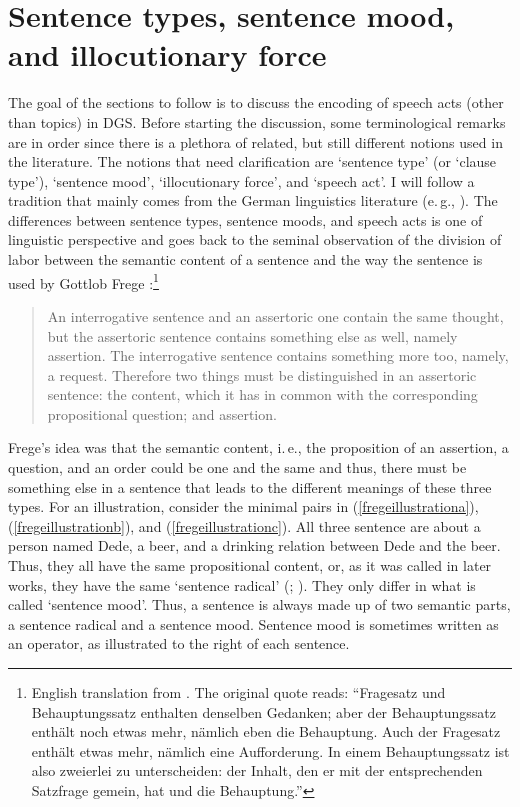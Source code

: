 \section{Sentence types, sentence mood, and illocutionary force}\label{sec:speechacts}
The goal of the sections to follow is to discuss the encoding of speech acts (other than topics) in DGS. Before starting the discussion, some terminological remarks are in order since there is a plethora of related, but still different notions used in the literature. The notions that need clarification are `sentence type' (or `clause type'), `sentence mood', `illocutionary force', and `speech act'. I will follow a tradition that mainly comes from the German linguistics literature (e.\,g., \citealt{meibauer1987probleme, zaefferer1987satztypen, grewendorf1991theorien, brandt1992satztyp, zaefferer2006types, gutzmann2015use}). The differences between sentence types, sentence moods, and speech acts is one of linguistic perspective and goes back to the seminal observation of the division of labor between the semantic content of a sentence and the way the sentence is used by Gottlob Frege \citet[62]{frege1918gedanke}:\footnote{ English translation from \citet[329]{frege1997thought}. The original quote reads: ``Fragesatz und Behauptungssatz enthalten denselben Gedanken; aber der Behauptungssatz enthält noch etwas mehr, nämlich eben die Behauptung. Auch der Fragesatz enthält etwas mehr, nämlich eine Aufforderung. In einem Behauptungssatz ist also zweierlei zu unterscheiden: der Inhalt, den er mit der entsprechenden Satzfrage gemein, hat und die Behauptung.''}

\begin{quote}
An interrogative sentence and an assertoric one contain the same thought, but the assertoric sentence contains something else as well, namely assertion. The interrogative sentence contains something more too, namely, a request. Therefore two things must be distinguished in an assertoric sentence: the content, which it has in common with the corresponding propositional question; and assertion.
\end{quote}

\noindent Frege's idea was that the semantic content, i.\,e., the proposition of an assertion, a question, and an order could be one and the same and thus, there must be something else in a sentence that leads to the different meanings of these three types. For an illustration, consider the minimal pairs in (\ref{fregeillustrationa}), (\ref{fregeillustrationb}), and (\ref{fregeillustrationc}). All three sentence are about a person named Dede, a beer, and a drinking relation between Dede and the beer. Thus, they all have the same propositional content, or, as it was called in later works, they have the same `sentence radical' (\citealt[\S 22]{wittgenstein1953phil}; \citealt{stenius1967mood}). They only differ in what is called `sentence mood'. Thus, a sentence is always made up of two semantic parts, a sentence radical and a sentence mood. Sentence mood is sometimes written as an operator, as illustrated to the right of each sentence.


